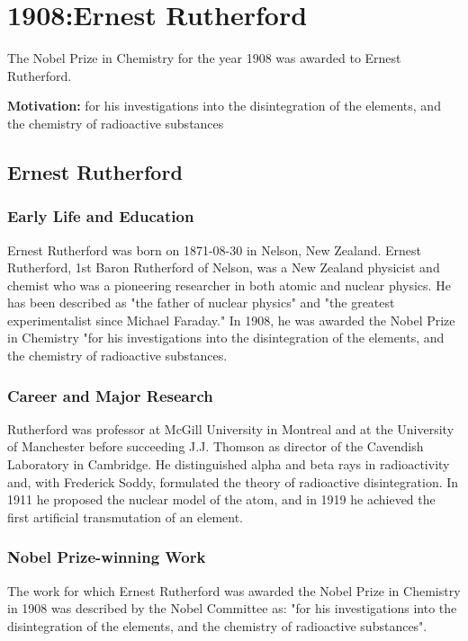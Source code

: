 \chapter{1908:Ernest Rutherford}
\label{chap:chemistry1908}

The Nobel Prize in Chemistry for the year 1908 was awarded to Ernest Rutherford.

\textbf{Motivation:}
for his investigations into the disintegration of the elements, and the chemistry of radioactive substances

\section{Ernest Rutherford}

\subsection*{Early Life and Education}

Ernest Rutherford was born on 1871-08-30 in Nelson, New Zealand.
Ernest Rutherford, 1st Baron Rutherford of Nelson, was a New Zealand physicist and chemist who was a pioneering researcher in both atomic and nuclear physics. He has been described as "the father of nuclear physics" and "the greatest experimentalist since Michael Faraday." In 1908, he was awarded the Nobel Prize in Chemistry "for his investigations into the disintegration of the elements, and the chemistry of radioactive substances.

\subsection*{Career and Major Research}

Rutherford was professor at McGill University in Montreal and at the University of Manchester before succeeding J.J. Thomson as director of the Cavendish Laboratory in Cambridge. He distinguished alpha and beta rays in radioactivity and, with Frederick Soddy, formulated the theory of radioactive disintegration. In 1911 he proposed the nuclear model of the atom, and in 1919 he achieved the first artificial transmutation of an element.

\subsection*{Nobel Prize-winning Work}

The work for which Ernest Rutherford was awarded the Nobel Prize in Chemistry in 1908 was described by the Nobel Committee as: "for his investigations into the disintegration of the elements, and the chemistry of radioactive substances".

